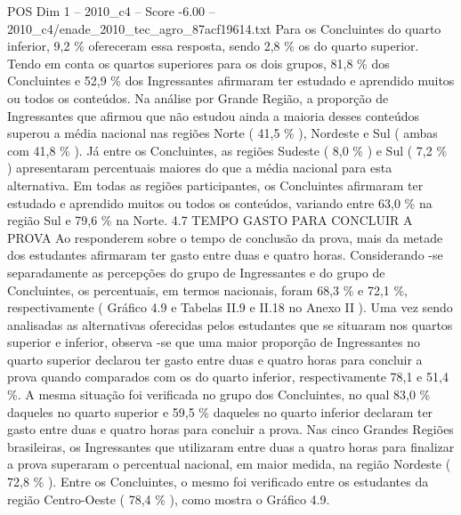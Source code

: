 \begin{textsample}{POS Dim 1 – 2010\_c4 – Score -6.00 – 2010\_c4/enade\_2010\_tec\_agro\_87acf19614.txt}
Para os Concluintes do quarto inferior, 9,2 \% ofereceram essa resposta, sendo 2,8 \% os do quarto superior.
Tendo em conta os quartos superiores para os dois grupos, 81,8 \% dos Concluintes e 52,9 \% dos Ingressantes afirmaram ter estudado e aprendido muitos ou todos os conteúdos.
Na análise por Grande Região, a proporção de Ingressantes que afirmou que não estudou ainda a maioria desses conteúdos superou a média nacional nas regiões Norte ( 41,5 \% ), Nordeste e Sul ( ambas com 41,8 \% ).
Já entre os Concluintes, as regiões Sudeste ( 8,0 \% ) e Sul ( 7,2 \% ) apresentaram percentuais maiores do que a média nacional para esta alternativa.
Em todas as regiões participantes, os Concluintes afirmaram ter estudado e aprendido muitos ou todos os conteúdos, variando entre 63,0 \% na região Sul e 79,6 \% na Norte. 4.7 TEMPO GASTO PARA CONCLUIR A PROVA Ao responderem sobre o tempo de conclusão da prova, mais da metade dos estudantes afirmaram ter gasto entre duas e quatro horas.
Considerando -se separadamente as percepções do grupo de Ingressantes e do grupo de Concluintes, os percentuais, em termos nacionais, foram 68,3 \% e 72,1 \%, respectivamente ( Gráfico 4.9 e Tabelas II.9 e II.18 no Anexo II ).
Uma vez sendo analisadas as alternativas oferecidas pelos estudantes que se situaram nos quartos superior e inferior, observa -se que uma maior proporção de Ingressantes no quarto superior declarou ter gasto entre duas e quatro horas para concluir a prova quando comparados com os do quarto inferior, respectivamente 78,1 e 51,4 \%.
A mesma situação foi verificada no grupo dos Concluintes, no qual 83,0 \% daqueles no quarto superior e 59,5 \% daqueles no quarto inferior declaram ter gasto entre duas e quatro horas para concluir a prova.
Nas cinco Grandes Regiões brasileiras, os Ingressantes que utilizaram entre duas a quatro horas para finalizar a prova superaram o percentual nacional, em maior medida, na região Nordeste ( 72,8 \% ).
Entre os Concluintes, o mesmo foi verificado entre os estudantes da região Centro-Oeste ( 78,4 \% ), como mostra o Gráfico 4.9.

\end{textsample}
